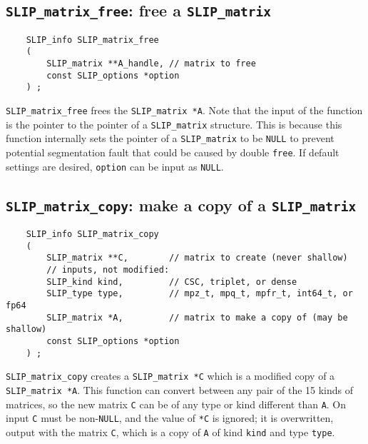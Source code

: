 \documentclass[12pt]{article}
\theoremstyle{definition}
\begin{document}
\cprotect\subsection{\verb|SLIP_matrix_free|: free a \verb|SLIP_matrix|}
\label{s:user:matrix_free}

\begin{mdframed}[userdefinedwidth=6in]
{\footnotesize
\begin{verbatim}
    SLIP_info SLIP_matrix_free
    (
        SLIP_matrix **A_handle, // matrix to free
        const SLIP_options *option
    ) ;
\end{verbatim}
} \end{mdframed}

\verb|SLIP_matrix_free| frees the \verb|SLIP_matrix *A|.  Note that the input
of the function is the pointer to the pointer of a \verb|SLIP_matrix|
structure. This is because this function internally sets the pointer of a
\verb|SLIP_matrix| to be \verb|NULL| to prevent potential segmentation fault
that could be caused by double \verb|free|.  If default settings are desired,
\verb|option| can be input as \verb|NULL|.

\cprotect\subsection{\verb|SLIP_matrix_copy|: make a copy of a \verb|SLIP_matrix|}
\label{s:user:matrix_copy}

\begin{mdframed}[userdefinedwidth=6in]
{\footnotesize
\begin{verbatim}
    SLIP_info SLIP_matrix_copy
    (
        SLIP_matrix **C,        // matrix to create (never shallow)
        // inputs, not modified:
        SLIP_kind kind,         // CSC, triplet, or dense
        SLIP_type type,         // mpz_t, mpq_t, mpfr_t, int64_t, or fp64
        SLIP_matrix *A,         // matrix to make a copy of (may be shallow)
        const SLIP_options *option
    ) ;
\end{verbatim}
} \end{mdframed}

\verb|SLIP_matrix_copy| creates a \verb|SLIP_matrix *C| which is a modified
copy of a \verb|SLIP_matrix *A|. This function can convert between any pair of
the 15 kinds of matrices, so the new matrix \verb|C| can be of any type or kind
different than \verb|A|.  On input \verb|C| must be non-\verb|NULL|, and the
value of \verb|*C| is ignored; it is overwritten, output with the matrix
\verb|C|, which is a copy of \verb|A| of kind \verb|kind| and type \verb|type|.
\end{document}
